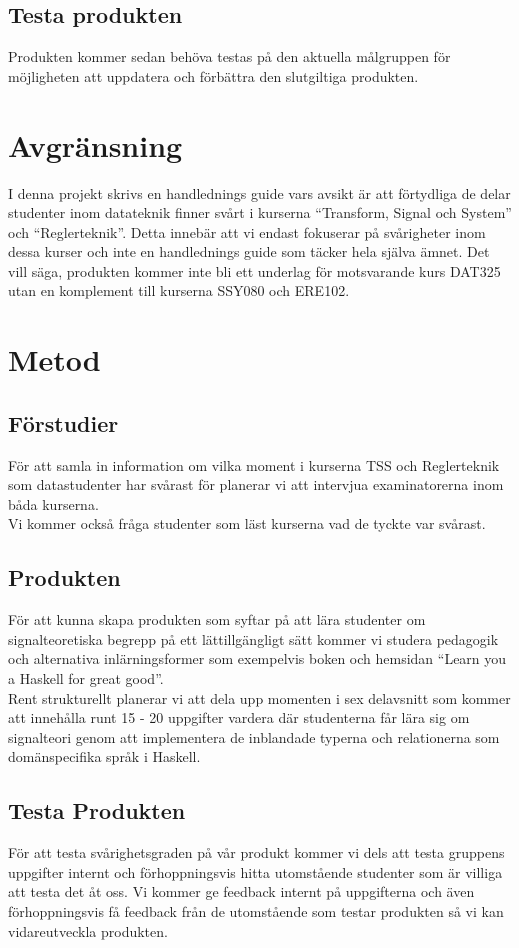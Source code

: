 \documentclass{article}
\begin{document}
\subsection{Testa produkten}
Produkten kommer sedan behöva testas på den aktuella målgruppen för möjligheten att uppdatera och förbättra den slutgiltiga produkten.
\section{Avgränsning}
I denna projekt skrivs en handlednings guide vars avsikt är att förtydliga de delar studenter inom datateknik finner svårt i kurserna “Transform, Signal och System” och “Reglerteknik”. Detta innebär att vi endast fokuserar på svårigheter inom dessa kurser och inte en handlednings guide som täcker hela själva ämnet.  Det vill säga, produkten kommer inte bli ett underlag för motsvarande kurs DAT325 utan en komplement till kurserna SSY080 och ERE102.
\section{Metod}
\subsection{Förstudier}
För att samla in information om vilka moment i kurserna TSS och Reglerteknik som datastudenter har svårast för planerar vi att intervjua examinatorerna inom båda kurserna.\\
Vi kommer också fråga studenter som läst kurserna vad de tyckte var svårast.
\subsection{Produkten}
För att kunna skapa produkten som syftar på att lära studenter om signalteoretiska begrepp på ett lättillgängligt sätt kommer vi studera pedagogik och alternativa inlärningsformer som exempelvis boken och hemsidan “Learn you a Haskell for great good”.\\
\newline
Rent strukturellt planerar vi att dela upp momenten i sex delavsnitt som kommer att innehålla runt 15 - 20 uppgifter vardera där studenterna får lära sig om signalteori genom att implementera de inblandade typerna och relationerna som domänspecifika språk i Haskell. 
\subsection{Testa Produkten}
För att testa svårighetsgraden på vår produkt kommer vi dels att testa gruppens uppgifter internt och förhoppningsvis hitta utomstående studenter som är villiga att testa det åt oss. Vi kommer ge feedback internt på uppgifterna och även förhoppningsvis få feedback från de utomstående som testar produkten så vi kan vidareutveckla produkten.
\end{document}
